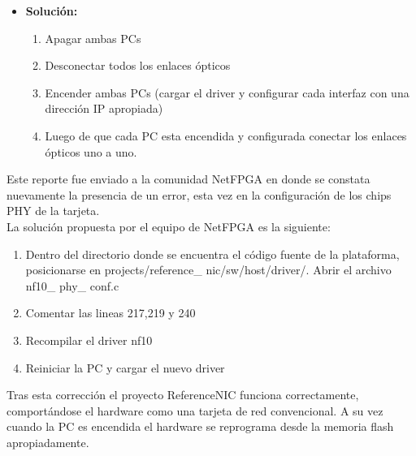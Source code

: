 \begin{itemize}
\item \textbf{Soluci\'on:}
\begin{enumerate}
\item Apagar ambas PCs
\item Desconectar todos los enlaces \'opticos
\item Encender ambas PCs (cargar el driver y configurar cada interfaz con una direcci\'on IP apropiada)
\item Luego de que cada PC esta encendida y configurada conectar los enlaces \'opticos uno a uno.
\end{enumerate}

\end{itemize}

Este reporte fue enviado a la comunidad NetFPGA en donde se constata nuevamente la presencia de un error, esta vez en la configuraci\'on de los chips PHY de la tarjeta.\\ 

La soluci\'on propuesta por el equipo de NetFPGA es la siguiente:

\begin{enumerate}
\item Dentro del directorio donde se encuentra el c\'odigo fuente de la plataforma, posicionarse en 
	  projects/reference\_ nic/sw/host/driver/. Abrir el archivo nf10\_ phy\_ conf.c 
\item Comentar las lineas 217,219 y 240
\item Recompilar el driver nf10
\item Reiniciar la PC y cargar el nuevo driver
\end{enumerate}

Tras esta correcci\'on el proyecto ReferenceNIC funciona correctamente, comportándose el hardware como una tarjeta de red convencional. A su vez cuando la PC es encendida el hardware se reprograma desde la memoria flash apropiadamente.


